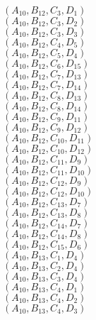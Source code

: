 \documentclass[14pt]{article}
\begin{document}
    $({A}_{10}, {B}_{12}, {C}_{3}, {D}_{1}) $ \\ 
    $({A}_{10}, {B}_{12}, {C}_{3}, {D}_{2}) $ \\ 
    $({A}_{10}, {B}_{12}, {C}_{3}, {D}_{3}) $ \\ 
    $({A}_{10}, {B}_{12}, {C}_{4}, {D}_{5}) $ \\ 
    $({A}_{10}, {B}_{12}, {C}_{5}, {D}_{4}) $ \\ 
    $({A}_{10}, {B}_{12}, {C}_{6}, {D}_{15}) $ \\ 
    $({A}_{10}, {B}_{12}, {C}_{7}, {D}_{13}) $ \\ 
    $({A}_{10}, {B}_{12}, {C}_{7}, {D}_{14}) $ \\ 
    $({A}_{10}, {B}_{12}, {C}_{8}, {D}_{13}) $ \\ 
    $({A}_{10}, {B}_{12}, {C}_{8}, {D}_{14}) $ \\ 
    $({A}_{10}, {B}_{12}, {C}_{9}, {D}_{11}) $ \\ 
    $({A}_{10}, {B}_{12}, {C}_{9}, {D}_{12}) $ \\ 
    $({A}_{10}, {B}_{12}, {C}_{10}, {D}_{11}) $ \\ 
    $({A}_{10}, {B}_{12}, {C}_{10}, {D}_{12}) $ \\ 
    $({A}_{10}, {B}_{12}, {C}_{11}, {D}_{9}) $ \\ 
    $({A}_{10}, {B}_{12}, {C}_{11}, {D}_{10}) $ \\ 
    $({A}_{10}, {B}_{12}, {C}_{12}, {D}_{9}) $ \\ 
    $({A}_{10}, {B}_{12}, {C}_{12}, {D}_{10}) $ \\ 
    $({A}_{10}, {B}_{12}, {C}_{13}, {D}_{7}) $ \\ 
    $({A}_{10}, {B}_{12}, {C}_{13}, {D}_{8}) $ \\ 
    $({A}_{10}, {B}_{12}, {C}_{14}, {D}_{7}) $ \\ 
    $({A}_{10}, {B}_{12}, {C}_{14}, {D}_{8}) $ \\ 
    $({A}_{10}, {B}_{12}, {C}_{15}, {D}_{6}) $ \\ 
    $({A}_{10}, {B}_{13}, {C}_{1}, {D}_{4}) $ \\ 
    $({A}_{10}, {B}_{13}, {C}_{2}, {D}_{4}) $ \\ 
    $({A}_{10}, {B}_{13}, {C}_{3}, {D}_{4}) $ \\ 
    $({A}_{10}, {B}_{13}, {C}_{4}, {D}_{1}) $ \\ 
    $({A}_{10}, {B}_{13}, {C}_{4}, {D}_{2}) $ \\ 
    $({A}_{10}, {B}_{13}, {C}_{4}, {D}_{3}) $ \\ 
\end{document}
